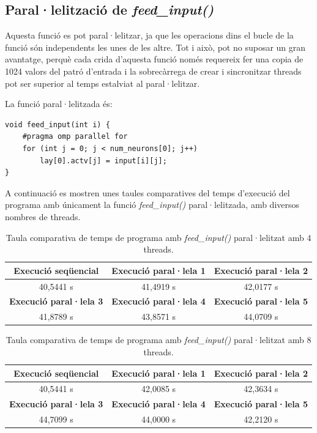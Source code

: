 \documentclass{article}
\begin{document}
\subsection{Paral·lelització de \textit{feed\_input()}}

Aquesta funció es pot paral·lelitzar, ja que les operacions dins el bucle de la funció són independents les unes de les altre.
Tot i això, pot no suposar un gran avantatge, perquè cada crida d'aquesta funció només requereix fer una copia de 1024 valors del patró d'entrada i la sobrecàrrega de crear i sincronitzar threads pot ser superior al temps estalviat al paral·lelitzar.

La funció paral·lelitzada és:
\begin{lstlisting}
void feed_input(int i) {
    #pragma omp parallel for
    for (int j = 0; j < num_neurons[0]; j++)
        lay[0].actv[j] = input[i][j];
}
\end{lstlisting}

A continuació es mostren unes taules comparatives del temps d'execució del programa amb únicament la funció \textit{feed\_input()} paral·lelitzada, amb diversos nombres de threads.

\begin{table}[H]
    \centering
    \begin{tabular}{|c|c|c|}
        \hline
        \textbf{Execució seqüencial} & \textbf{Execució paral·lela 1} & \textbf{Execució paral·lela 2} \\ \hline
        40,5441 s & 41,4919 s & 42,0177 s \\ \hline
        \textbf{Execució paral·lela 3} & \textbf{Execució paral·lela 4} & \textbf{Execució paral·lela 5} \\ \hline
        41,8789 s & 43,8571 s & 44,0709 s \\ \hline
    \end{tabular}
    \caption{Taula comparativa de temps de programa amb \textit{feed\_input()} paral·lelitzat amb 4 threads.}
    \label{tab:f1_4trheads}
\end{table}

\begin{table}[H]
    \centering
    \begin{tabular}{|c|c|c|}
        \hline
        \textbf{Execució seqüencial} & \textbf{Execució paral·lela 1} & \textbf{Execució paral·lela 2} \\ \hline
        40,5441 s & 42,0085 s & 42,3634 s \\ \hline
        \textbf{Execució paral·lela 3} & \textbf{Execució paral·lela 4} & \textbf{Execució paral·lela 5} \\ \hline
        44,7099 s & 44,0000 s & 42,2120 s \\ \hline
    \end{tabular}
    \caption{Taula comparativa de temps de programa amb \textit{feed\_input()} paral·lelitzat amb 8 threads.}
    \label{tab:f1_8trheads}
\end{table}
\end{document}
